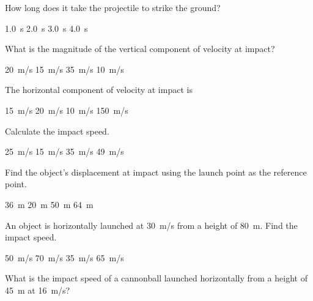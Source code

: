 \documentclass[../main-physics-problems.tex]{subfiles}
\begin{document}
\begin{questions}
\question \label{V3NNS}
How long does it take the projectile to strike the ground?

\begin{randomizechoices}[norandomize]
    \choice \SI{1.0}{s}
    \correctchoice \SI{2.0}{s}
    \choice \SI{3.0}{s}
    \choice \SI{4.0}{s}
\end{randomizechoices}

\question 
What is the magnitude of the vertical component of velocity at impact?

\begin{randomizechoices}
    \correctchoice \SI{20}{m/s}
    \choice \SI{15}{m/s}
    \choice \SI{35}{m/s}
    \choice \SI{10}{m/s}
\end{randomizechoices}

\question 
The horizontal component of velocity at impact is

\begin{randomizechoices}
    \correctchoice \SI{15}{m/s}
    \choice \SI{20}{m/s}
    \choice \SI{10}{m/s}
    \choice \SI{150}{m/s}
\end{randomizechoices}

\question
Calculate the impact speed.

\begin{randomizechoices}
    \correctchoice \SI{25}{m/s}
    \choice \SI{15}{m/s}
    \choice \SI{35}{m/s}
    \choice \SI{49}{m/s}
\end{randomizechoices}

\question \label{fhUcL}
Find the object's displacement at impact using the launch point as the reference point.

\begin{randomizechoices}
    \correctchoice \SI{36}{m}
    \choice \SI{20}{m}
    \choice \SI{50}{m}
    \choice \SI{64}{m}
\end{randomizechoices}

\clearpage

\question
An object is horizontally launched at \SI{30}{m/s} from a height of \SI{80}{m}. Find the impact speed.

\begin{randomizechoices}
    \correctchoice \SI{50}{m/s}
    \choice \SI{70}{m/s}
    \choice \SI{35}{m/s}
    \choice \SI{65}{m/s}
\end{randomizechoices}

\question
What is the impact speed of a cannonball launched horizontally from a height of \SI{45}{m} at \SI{16}{m/s}?


\end{questions}
\end{document}
